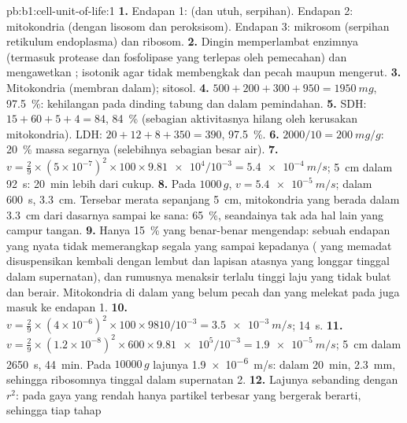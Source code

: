 \begin{solution}{pb:b1:cell-unit-of-life:1}
\textbf{1.} Endapan 1:  (dan  utuh, serpihan). Endapan 2:
mitokondria (dengan lisosom dan peroksisom). Endapan 3: mikrosom
(serpihan retikulum endoplasma) dan ribosom.
\textbf{2.} Dingin memperlambat enzimnya (termasuk protease dan
fosfolipase yang terlepas oleh pemecahan) dan mengawetkan ;
isotonik agar  tidak membengkak dan pecah maupun mengerut.
\textbf{3.} Mitokondria (membran dalam); sitosol.
\textbf{4.} $500 + 200 + 300 + 950 = \qty{1950}{mg}$, \qty{97.5}{\%}:
kehilangan pada dinding tabung dan dalam pemindahan.
\textbf{5.} SDH: $15 + 60 + 5 + 4 = 84$, \qty{84}{\%} (sebagian
aktivitasnya hilang oleh kerusakan mitokondria). LDH:
$20 + 12 + 8 + 350 = 390$,
\qty{97.5}{\%}.
\textbf{6.} $2000/10 = \qty{200}{mg/g}$: \qty{20}{\%} massa segarnya (selebihnya sebagian besar air).
\textbf{7.} $v = \frac{2}{9}\times(5\times 10^{-7})^2\times 100\times
\num{9.81e4}/10^{-3} = \qty{5.4e-4}{m/s}$; \qty{5}{cm} dalam
\qty{92}{s}: \qty{20}{min} lebih dari cukup.
\textbf{8.} Pada $1000\,g$, $v = \qty{5.4e-5}{m/s}$; dalam \qty{600}{s},
\qty{3.3}{cm}. Tersebar merata sepanjang \qty{5}{cm}, mitokondria yang
berada dalam \qty{3.3}{cm} dari dasarnya sampai ke sana: \qty{65}{\%},
seandainya tak ada hal lain yang campur tangan.
\textbf{9.} Hanya \qty{15}{\%} yang benar-benar mengendap: sebuah
endapan yang nyata tidak memerangkap segala yang sampai kepadanya (
yang memadat disuspensikan kembali dengan lembut dan lapisan atasnya
yang longgar tinggal dalam supernatan), dan rumusnya menaksir terlalu
tinggi laju  yang tidak bulat dan berair. Mitokondria di dalam
 yang belum pecah dan yang melekat pada  juga masuk ke endapan 1.
\textbf{10.} $v = \frac{2}{9}\times(4\times 10^{-6})^2\times 100\times
9810/10^{-3} = \qty{3.5e-3}{m/s}$; \qty{14}{s}.
\textbf{11.} $v = \frac{2}{9}\times(1.2\times 10^{-8})^2\times 600\times
\num{9.81e5}/10^{-3} = \qty{1.9e-5}{m/s}$; \qty{5}{cm} dalam
\qty{2650}{s}, \qty{44}{min}. Pada $\num{10000}\,g$ lajunya
\qty{1.9e-6}{m/s}: dalam \qty{20}{min}, \qty{2.3}{mm}, sehingga
ribosomnya tinggal dalam supernatan 2.
\textbf{12.} Lajunya sebanding dengan $r^2$: pada gaya yang rendah hanya
partikel terbesar yang bergerak berarti, sehingga tiap tahap

\end{solution}

